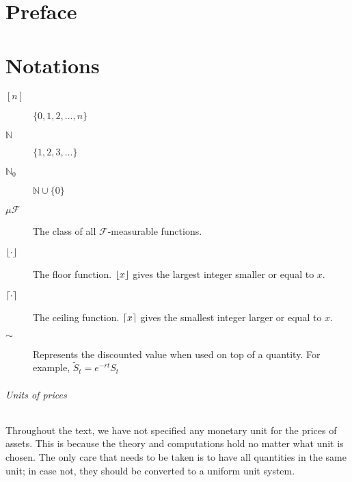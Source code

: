 \documentclass[12pt,a4paper,oneside]{amsbook}
\begin{document}
\frontmatter






%

\tableofcontents



\chapter*{Preface}
\label{cha:preface}



\chapter*{Notations}
\begin{description}
	\item[$ {[n]} $] $ \{0, 1, 2, \dots, n\} $
	\item[$ \mathbb{N} $] $ \{ 1, 2, 3, \dots \} $
	\item[$ \mathbb{N}_0 $] $ \mathbb{N} \cup \{ 0 \} $
	\item[$ \mu \mathcal{F} $] The class of all $ \mathcal{F} $-measurable functions.
	\item[$ \left\lfloor\cdot\right\rfloor $] The floor function. $ \left\lfloor x\right\rfloor $ gives the largest integer smaller or equal to $ x $.
	\item[$ \left\lceil\cdot\right\rceil $] The ceiling function. $ \left\lceil x\right\rceil $ gives the smallest integer larger or equal to $ x $.
	\item[$ \sim $] Represents the discounted value when used on top of a quantity. For example, $ \tilde{S}_t = e^{-rt} S_t $
\end{description}

\subparagraph{Units of prices} Throughout the text, we have not specified any monetary unit for the prices of assets. This is because the theory and computations hold no matter what unit is chosen. The only care that needs to be taken is to have all quantities in the same unit; in case not, they should be converted to a uniform unit system.
\end{document}
